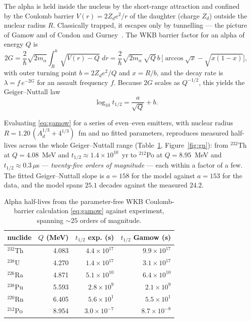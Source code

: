 \documentclass[11pt]{article}
\begin{document}
The alpha is held inside the nucleus by the short-range attraction and confined by the Coulomb barrier
$V(r)=2Z_d e^2/r$ of the daughter (charge $Z_d$) outside the nuclear radius $R$. Classically trapped, it
escapes only by tunnelling --- the picture of Gamow and of Condon and Gurney~\cite{Gamow1928,Condon1928}.
The WKB barrier factor for an alpha of energy $Q$ is
\begin{equation}
2G=\frac{2}{\hbar}\sqrt{2m_\alpha}\int_R^{b}\!\sqrt{V(r)-Q}\;dr
=\frac{2}{\hbar}\sqrt{2m_\alpha}\,\sqrt{Q}\,b\,\Big[\arccos\sqrt{x}-\sqrt{x(1-x)}\Big],
\label{eq:gamow}
\end{equation}
with outer turning point $b=2Z_d e^2/Q$ and $x=R/b$, and the decay rate is $\lambda=f\,e^{-2G}$ for an
assault frequency $f$. Because $2G$ scales as $Q^{-1/2}$, this yields the Geiger--Nuttall law
\begin{equation}
\log_{10}t_{1/2}=\frac{a}{\sqrt{Q}}+b .
\label{eq:gn}
\end{equation}

Evaluating \eqref{eq:gamow} for a series of even--even emitters, with nuclear radius
$R=1.20\,(A_d^{1/3}+4^{1/3})$~fm and no fitted parameters, reproduces measured half-lives across the whole
Geiger--Nuttall range (Table~\ref{tab:gn}, Figure~\ref{fig:gn}): from $^{232}$Th at $Q=4.08$~MeV and $t_{1/2}\approx1.4\times
10^{10}$~yr to $^{212}$Po at $Q=8.95$~MeV and $t_{1/2}\approx0.3\,\mu$s --- \emph{twenty-five orders of
magnitude} --- each within a factor of a few. The fitted Geiger--Nuttall slope is $a=158$ for the model
against $a=153$ for the data, and the model spans $25.1$ decades against the measured $24.2$.

\begin{table}[h]
\centering
\begin{tabular}{lrrr}
\hline
nuclide & $Q$ (MeV) & $t_{1/2}$ exp. (s) & $t_{1/2}$ Gamow (s) \\
\hline
$^{232}$Th & 4.083 & $4.4\times10^{17}$ & $9.9\times10^{17}$ \\
$^{238}$U  & 4.270 & $1.4\times10^{17}$ & $3.1\times10^{17}$ \\
$^{226}$Ra & 4.871 & $5.1\times10^{10}$ & $6.4\times10^{10}$ \\
$^{238}$Pu & 5.593 & $2.8\times10^{9}$  & $2.1\times10^{9}$  \\
$^{220}$Rn & 6.405 & $5.6\times10^{1}$  & $5.5\times10^{1}$  \\
$^{212}$Po & 8.954 & $3.0\times10^{-7}$ & $8.7\times10^{-8}$ \\
\hline
\end{tabular}
\caption{Alpha half-lives from the parameter-free WKB Coulomb-barrier calculation \eqref{eq:gamow} against
experiment, spanning $\sim25$ orders of magnitude.}
\label{tab:gn}
\end{table}
\end{document}
